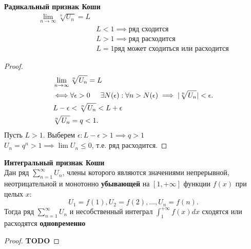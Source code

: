 \begin{priz}
    \label{priz:radcauchy} \textbf{Радикальный признак Коши} \\
    \begin{equation}
        \begin{align*}
            \lim_{n\to\infty}\sqrt[n]{U_{n}} = L \\
            &L < 1\implies \text{ряд сходится}\\
            &L > 1\implies \text{ряд расходится}\\
            &L = 1\text{ряд может сходиться или расходится}
        \end{align*}
    \end{equation}
    \begin{proof}
        \begin{equation}
            \begin{align*}
                &\lim_{n\to\infty}\sqrt[n]{U_{n}} = L\\
                &\Longleftrightarrow\forall \epsilon > 0 
                \hspace{0.5cm} \exists N(\epsilon): \forall n > N(\epsilon)
                \implies |\sqrt[n]{U_{n}}| < \epsilon.\\
                &L - \epsilon < \sqrt[n]{U_{n}} < L + \epsilon\\
                &\sqrt[n]{U_{n}} = q < 1.
            \end{align*}
        \end{equation}
        Пусть \(L > 1\). Выберем \(\epsilon: L - \epsilon > 1 \implies q > 1\)\\
        \(U_{n} = q^{n} > 1 \implies\lim U_{n} \leq 0\), т.е. ряд расходится.
    \end{proof}
\end{priz}


\begin{priz}
    \label{priz:intcauchy} \textbf{Интегральный признак Коши} \\
    Дан ряд \(\sum_{n=1}^{\infty} U_{n}\), члены которого являются значениями 
    непрерывной, неотрицательной и монотонно \textbf{убывающей} 
    на \([1, +\infty]\) функции \(f(x)\) при целых \(x\):
    \begin{equation}
        U_{1} = f(1), U_{2} = f(2), \dots , U_{n} = f(n).
    \end{equation}
    Тогда ряд \(\sum_{n=1}^{\infty} U_{n}\) 
    и несобственный интеграл \(\int_{1}^{+\infty} f(x)dx \)
    сходятся или расходятся \textbf{одновременно}

    \begin{proof}
        \color{YellowOrange}\textbf{TODO}
    \end{proof}
\end{priz}


